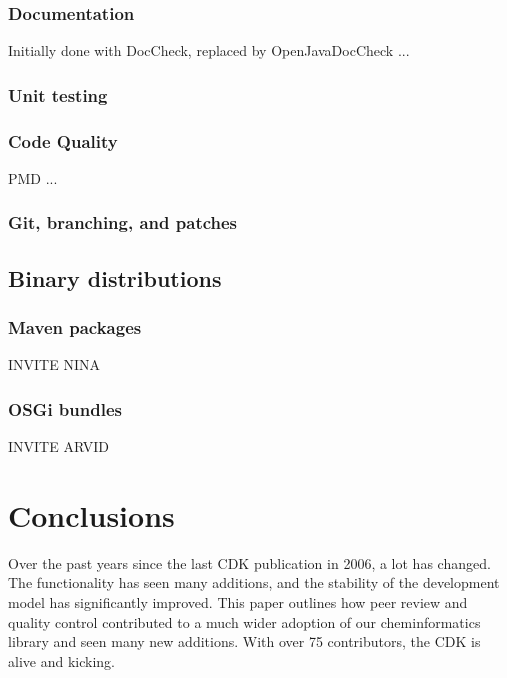\documentclass[10pt]{bmc_article}
\newenvironment{bmcformat}{\begin{raggedright}\baselineskip20pt\sloppy\setboolean{publ}{false}}{\end{raggedright}\baselineskip20pt\sloppy}
\begin{document}
\begin{bmcformat}
  \subsubsection*{Documentation}

  Initially done with DocCheck, replaced by OpenJavaDocCheck ...
  
  \subsubsection*{Unit testing}
  
  \subsubsection*{Code Quality}

  PMD ...

  \subsubsection*{Git, branching, and patches}
  
\subsection*{Binary distributions}

\subsubsection*{Maven packages}

INVITE NINA

\subsubsection*{OSGi bundles}

INVITE ARVID


\section*{Conclusions}

Over the past years since the last CDK publication in 2006, a lot has changed. The functionality
has seen many additions, and the stability of the development model has significantly improved.
This paper outlines how peer review and quality control contributed to a much wider adoption
of our cheminformatics library and seen many new additions. With over 75 contributors,
the CDK is alive and kicking.


\end{bmcformat}
\end{document}
